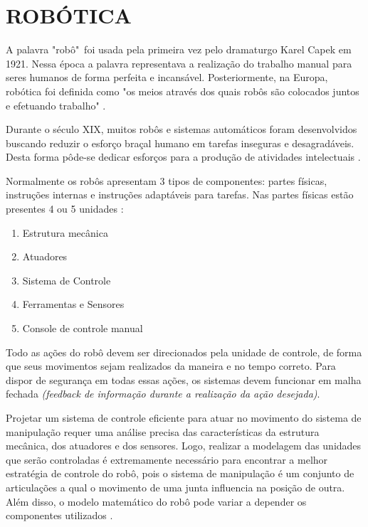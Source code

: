 \documentclass[12pt,oneside,a4paper, chapter=TITLE, section = TITLE, english, brazil]{abntex2}
\begin{document}

\chapter{ROBÓTICA} %

A palavra "robô"\ foi usada pela primeira vez pelo dramaturgo Karel Capek em 1921. Nessa época a palavra representava a realização do trabalho manual para seres humanos de forma perfeita e incansável. Posteriormente, na Europa, robótica foi definida como "os meios através dos quais robôs são colocados juntos e efetuando trabalho" \cite{fuller}.

Durante o século XIX, muitos robôs e sistemas automáticos foram desenvolvidos buscando reduzir o esforço braçal humano em tarefas inseguras e desagradáveis. Desta forma pôde-se dedicar esforços para a produção de atividades intelectuais \cite{silveira}.

Normalmente os robôs apresentam 3 tipos de componentes: partes físicas, instruções internas e instruções adaptáveis para tarefas. Nas partes físicas estão presentes 4 ou 5 unidades \cite{fuller}:

\begin{enumerate}

\item Estrutura mecânica

\item Atuadores

\item Sistema de Controle 

\item Ferramentas e Sensores

\item Console de controle manual

\end{enumerate}

Todo as ações do robô devem ser direcionados pela unidade de controle, de forma que seus movimentos sejam realizados da maneira e no tempo correto. Para dispor de segurança em todas essas ações, os sistemas devem funcionar em malha fechada \textit{(feedback de informação durante a realização da ação desejada)}.

Projetar um sistema de controle eficiente para atuar no movimento do sistema de manipulação requer uma análise precisa das características da estrutura mecânica, dos atuadores e dos sensores. Logo, realizar a modelagem das unidades que serão controladas é extremamente necessário para encontrar a melhor estratégia de controle do robô, pois o sistema de manipulação é um conjunto de articulações a qual o movimento de uma junta influencia na posição de outra. Além disso, o modelo matemático do robô pode variar a depender os componentes utilizados \cite{sciavicco}.
\end{document}
